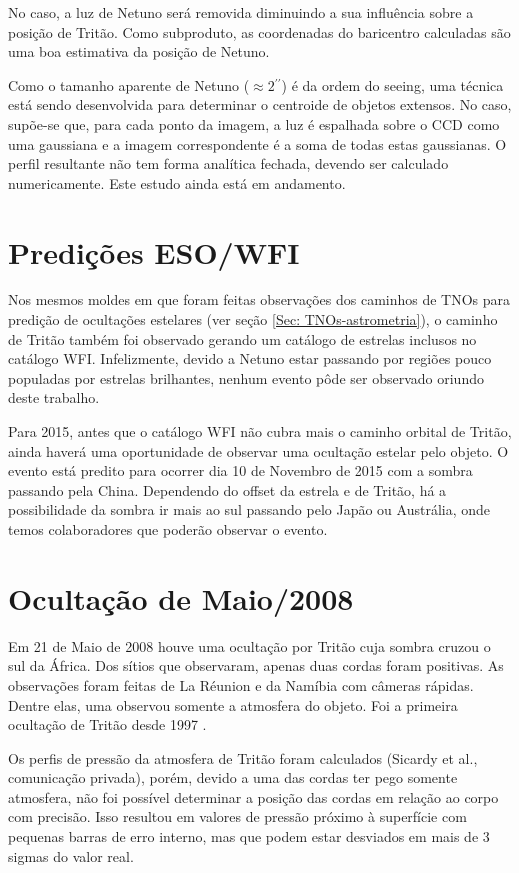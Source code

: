 \documentclass[12pt,a4paper]{monografia}
\newcommand{\arcsec}{\ensuremath{^{\prime\prime}}}%
\begin{document}
No caso, a luz de Netuno será removida diminuindo a sua influência sobre a posição de Tritão. Como subproduto, as coordenadas do baricentro calculadas são uma boa estimativa da posição de Netuno.

Como o tamanho aparente de Netuno ($\approx 2\arcsec$) é da ordem do seeing, uma técnica está sendo desenvolvida para determinar o centroide de objetos extensos. No caso, supõe-se que, para cada ponto da imagem, a luz é espalhada sobre o CCD como uma gaussiana e a imagem correspondente é a soma de todas estas gaussianas. O perfil resultante não tem forma analítica fechada, devendo ser calculado numericamente. Este estudo ainda está em andamento.


\section{Predições ESO/WFI}
\label{Sec: Netuno-predic}

\indent \indent Nos mesmos moldes em que foram feitas observações dos caminhos de TNOs para predição de ocultações estelares (ver seção \ref{Sec: TNOs-astrometria}), o caminho de Tritão também foi observado gerando um catálogo de estrelas inclusos no catálogo WFI. Infelizmente, devido a Netuno estar passando por regiões pouco populadas por estrelas brilhantes, nenhum evento pôde ser observado oriundo deste trabalho.

Para 2015, antes que o catálogo WFI não cubra mais o caminho orbital de Tritão, ainda haverá uma oportunidade de observar uma ocultação estelar pelo objeto. O evento está predito para ocorrer dia 10 de Novembro de 2015 com a sombra passando pela China. Dependendo do offset da estrela e de Tritão, há a possibilidade da sombra ir mais ao sul passando pelo Japão ou Austrália, onde temos colaboradores que poderão observar o evento.


\section{Ocultação de Maio/2008}
\label{Sec: Netuno-maio2008}

\indent \indent Em 21 de Maio de 2008 houve uma ocultação por Tritão cuja sombra cruzou o sul da África. Dos sítios que observaram, apenas duas cordas foram positivas. As observações foram feitas de La Réunion e da Namíbia com câmeras rápidas. Dentre elas, uma observou somente a atmosfera do objeto. Foi a primeira ocultação de Tritão desde 1997 \citep{Elliot2000}.

Os perfis de pressão da atmosfera de Tritão foram calculados (Sicardy et al., comunicação privada), porém, devido a uma das cordas ter pego somente atmosfera, não foi possível determinar a posição das cordas em relação ao corpo com precisão. Isso resultou em valores de pressão próximo à superfície com pequenas barras de erro interno, mas que podem estar desviados em mais de 3 sigmas do valor real.
\end{document}
